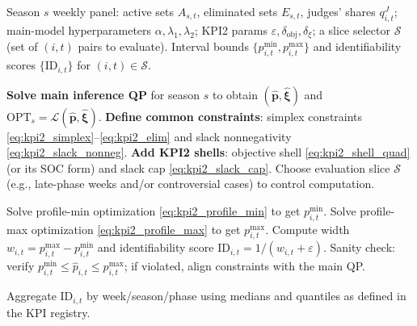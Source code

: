 \begin{algorithm}[H]
\caption{KPI2 computation via profile optimization (per season)}
\label{alg:kpi2}
\small
\begin{algorithmic}[1]  %
    \Require 
        Season $s$ weekly panel: active sets $A_{s,t}$, eliminated sets $E_{s,t}$, judges' shares $q^J_{i,t}$; 
        main-model hyperparameters $\alpha,\lambda_1,\lambda_2$; 
        KPI2 params $\varepsilon,\delta_{\mathrm{obj}},\delta_\xi$; 
        a slice selector $\mathcal{S}$ (set of $(i,t)$ pairs to evaluate).
    \Ensure 
        Interval bounds $\{p^{\min}_{i,t},p^{\max}_{i,t}\}$ and identifiability scores $\{\mathrm{ID}_{i,t}\}$ for $(i,t)\in\mathcal{S}$.

    \State \textbf{Solve main inference QP} for season $s$ to obtain $(\hat{\mathbf{p}},\hat{\boldsymbol{\xi}})$ and $\mathrm{OPT}_s=\mathcal{L}(\hat{\mathbf{p}},\hat{\boldsymbol{\xi}})$.
    \State \textbf{Define common constraints}: simplex constraints \eqref{eq:kpi2_simplex}--\eqref{eq:kpi2_elim} and slack nonnegativity \eqref{eq:kpi2_slack_nonneg}.
    \State \textbf{Add KPI2 shells}: objective shell \eqref{eq:kpi2_shell_quad} (or its SOC form) and slack cap \eqref{eq:kpi2_slack_cap}.
    \State Choose evaluation slice $\mathcal{S}$ (e.g., late-phase weeks and/or controversial cases) to control computation.
    
        \State Solve profile-min optimization \eqref{eq:kpi2_profile_min} to get $p^{\min}_{i,t}$.
        \State Solve profile-max optimization \eqref{eq:kpi2_profile_max} to get $p^{\max}_{i,t}$.
        \State Compute width $w_{i,t}=p^{\max}_{i,t}-p^{\min}_{i,t}$ and identifiability score $\mathrm{ID}_{i,t}=1/(w_{i,t}+\varepsilon)$.
        \State Sanity check: verify $p^{\min}_{i,t}\le \hat p_{i,t}\le p^{\max}_{i,t}$; if violated, align constraints with the main QP.
    \EndFor
    
    \State Aggregate $\mathrm{ID}_{i,t}$ by week/season/phase using medians and quantiles as defined in the KPI registry.
\end{algorithmic}
\end{algorithm}

